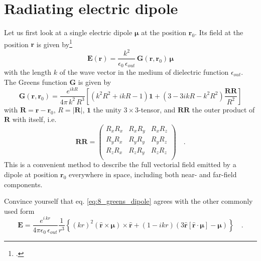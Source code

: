 \section{Radiating electric dipole}

Let us first look at a single electric dipole $\boldsymbol{\mu}$ at the position $\mathbf{r}_0$. Its field at the position $\mathbf{r}$ is given by\footcite[eq. 8.52]{Novotny-Hecht2012} 
\begin{equation}
\mathbf{E}(\mathbf{r}) = \frac{k^2}{\epsilon_0 \, \epsilon_{out}} \, \mathbf{G}(\mathbf{r}, \mathbf{r}_0) \,  \boldsymbol{\mu}
\end{equation}
with the length $k$ of the wave vector in the medium of dielectric function $\epsilon_{out}$.
The Greens function $\mathbf{G}$ is given by
\begin{equation}
\mathbf{G}(\mathbf{r}, \mathbf{r}_0) = \frac{e^{i k R} }{4 \pi \, k^2 \, R^3 } 
\left[  
 \left( k^2 R^2 + i k R  - 1 \right) \mathbf{1}  +    
  \left( 3 - 3 i k R - k^2 R^2  \right) \frac{\mathbf{RR}}{R^2}   
  \right] \label{eq:8_greens_dipole}
\end{equation}
with $\mathbf{R} = \mathbf{r} - \mathbf{r}_0$, $R = |\mathbf{R}|$, $\mathbf{1}$ the unity $3 \times 3$-tensor, and $\mathbf{RR}$ the outer product of $\mathbf{R}$ with itself, i.e.
\begin{equation}
\mathbf{RR} = 
\begin{pmatrix}
R_x R_x &  R_x R_y & R_x R_z \\
R_y R_x &  R_y R_y & R_y R_z \\
R_z R_x &  R_z R_y & R_z R_z \\
\end{pmatrix} \quad .
\end{equation}
This is a convenient method to describe the full vectorial field emitted by a dipole at position  $\mathbf{r}_0$ everywhere in space, including both near- and far-field components.

\begin{questions}
\item Convince yourself that eq. \ref{eq:8_greens_dipole} agrees with the other commonly used form 
\begin{equation}
  \mathbf{E} = \frac{ e^{i \, k  r} }{4\pi\epsilon_0 \, \epsilon_{out}}  \frac{1}{r^3}\left\{
      (k r )^2 \left( \hat{\mathbf{r}} \times \boldsymbol{\mu} \right) \times \hat{\mathbf{r}} +
      \left( 1 -  i k r \right)
        \left( 3\hat{\mathbf{r}} \left[\hat{\mathbf{r}} \cdot \boldsymbol{\mu}\right] - \boldsymbol{\mu} \right)
    \right\} \quad .
\end{equation}
\end{questions}

